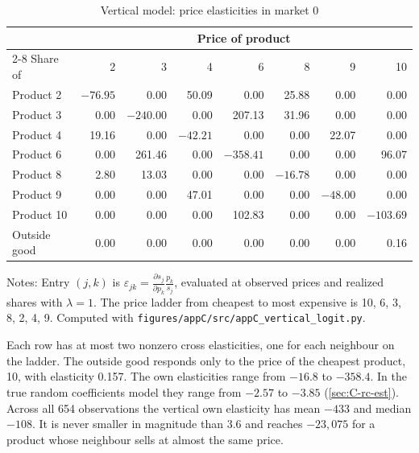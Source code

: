 \begin{table}[htbp]
\centering
\caption{Vertical model: price elasticities in market 0}
\label{tab:C-velast}
\small
\begin{tabular}{@{}lrrrrrrr@{}}
\toprule
 & \multicolumn{7}{c}{Price of product} \\
\cmidrule(lr){2-8}
Share of & 2 & 3 & 4 & 6 & 8 & 9 & 10 \\
\midrule
Product 2 & $-76.95$ & 0.00 & 50.09 & 0.00 & 25.88 & 0.00 & 0.00 \\
Product 3 & 0.00 & $-240.00$ & 0.00 & 207.13 & 31.96 & 0.00 & 0.00 \\
Product 4 & 19.16 & 0.00 & $-42.21$ & 0.00 & 0.00 & 22.07 & 0.00 \\
Product 6 & 0.00 & 261.46 & 0.00 & $-358.41$ & 0.00 & 0.00 & 96.07 \\
Product 8 & 2.80 & 13.03 & 0.00 & 0.00 & $-16.78$ & 0.00 & 0.00 \\
Product 9 & 0.00 & 0.00 & 47.01 & 0.00 & 0.00 & $-48.00$ & 0.00 \\
Product 10 & 0.00 & 0.00 & 0.00 & 102.83 & 0.00 & 0.00 & $-103.69$ \\
Outside good & 0.00 & 0.00 & 0.00 & 0.00 & 0.00 & 0.00 & 0.16 \\
\bottomrule
\end{tabular}

\vspace{3pt}
\begin{minipage}{0.97\textwidth}
\footnotesize Notes: Entry $(j, k)$ is $\varepsilon_{jk} = \frac{\partial s_j}{\partial p_k}
\frac{p_k}{s_j}$, evaluated at observed prices and realized shares with $\lambda = 1$. The price ladder from cheapest to most
expensive is 10, 6, 3, 8, 2, 4, 9.
Computed with \texttt{figures/appC/src/appC\_vertical\_logit.py}.
\end{minipage}
\end{table}

Each row has at most two nonzero cross elasticities, one for each neighbour on the ladder. The outside good responds only
to the price of the cheapest product, 10, with elasticity 0.157. The own elasticities range from $-16.8$ to $-358.4$. In
the true random coefficients model they range from $-2.57$ to $-3.85$ (\cref{sec:C-rc-est}). Across all 654
observations the vertical own elasticity has mean $-433$ and median $-108$. It is never smaller in magnitude than
3.6 and reaches $-23{,}075$ for a product whose neighbour sells at almost the same price.

